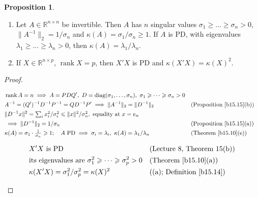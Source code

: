 \documentclass[12pt]{article}
\newcommand{\R}{\mathbb R}
\DeclareMathOperator{\diag}{diag}
\DeclareMathOperator{\rank}{rank}
\theoremstyle{definition}
\newtheorem{proposition}[theorem]{Proposition}
\newcommand{\lec}[1]{Lecture~#1}
\newcommand{\boardtop}{\vspace*{-\abovedisplayskip}}
\begin{document}
\begin{proposition}\label{b15.27}
\begin{enumerate}
\item Let \(A\in\R^{n\times n}\) be invertible. Then \(A\) has \(n\) singular values
\(\sigma_1\geqslant\dots\geqslant\sigma_n>0\), \(\lVert A^{-1}\rVert_2=1/\sigma_n\) and \(\kappa(A)=\sigma_1/\sigma_n\geqslant1\).
If \(A\) is PD, with eigenvalues \(\lambda_1\geqslant\dots\geqslant\lambda_n>0\), then \(\kappa(A)=\lambda_1/\lambda_n\).
\item If \(X\in\R^{n\times p}\), \(\rank X=p\), then \(X'X\) is PD and \(\kappa(X'X)=\kappa(X)^2\).
\end{enumerate}
\end{proposition}
\begin{proof}
\begin{board}[(a) \lec{4}, Theorem~12(d); Theorem~\ref{b15.9}(b) with \(r=n\); \lec{2}, Theorem~11(b); \lec{6},
Theorem~9:]
\boardtop
\begin{align*}
&\rank A=n\implies A=PDQ',\ D=\diag(\sigma_1,\dots,\sigma_n),\ \sigma_1\geqslant\dots\geqslant\sigma_n>0\\
&A^{-1}=(Q')^{-1}D^{-1}P^{-1}=QD^{-1}P'\implies\lVert A^{-1}\rVert_2=\lVert D^{-1}\rVert_2&&\text{(Proposition~\ref{b15.15}(b))}\\
&\lVert D^{-1}x\rVert^2=\textstyle\sum_ix_i^2/\sigma_i^2\leqslant\lVert x\rVert^2/\sigma_n^2,\ \text{equality at }x=e_n\\
&\implies\lVert D^{-1}\rVert_2=1/\sigma_n&&\text{(Proposition~\ref{b15.15}(a))}\\
&\kappa(A)=\sigma_1\cdot\tfrac1{\sigma_n}\geqslant1;\quad A\text{ PD}\implies\sigma_i=\lambda_i,\ \kappa(A)=\lambda_1/\lambda_n
&&\text{(Theorem~\ref{b15.10}(e))}
\end{align*}
\end{board}
\begin{board}[(b) \(\sigma_1\geqslant\dots\geqslant\sigma_p>0\): the singular values of \(X\) (\(r=p\)):]
\boardtop
\begin{align*}
&X'X\text{ is PD}&&\text{(\lec{8}, Theorem~15(b))}\\
&\text{its eigenvalues are }\sigma_1^2\geqslant\dots\geqslant\sigma_p^2>0&&\text{(Theorem~\ref{b15.10}(a))}\\
&\kappa(X'X)=\sigma_1^2/\sigma_p^2=\kappa(X)^2&&\text{((a); Definition~\ref{b15.14})}
\end{align*}
\end{board}
\nopagebreak
\end{proof}
\end{document}

